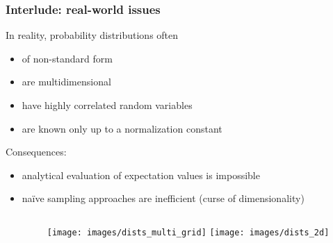 \documentclass[t,aspectratio=169]{beamer}
\begin{document}
\begin{frame}
  \frametitle{Interlude: real-world issues}
  In reality, probability distributions often
  \begin{itemize}
  \item of non-standard form
  \item are multidimensional
  \item have highly correlated random variables
  \item are known only up to a normalization constant
  \end{itemize}
  Consequences:
  \begin{itemize}
  \item analytical evaluation of expectation values is impossible
  \item naïve sampling approaches are inefficient (curse of dimensionality)
  \end{itemize}
  \begin{columns}
    \begin{column}[T]{0.33\textwidth}
    \end{column}
    \begin{column}[T]{0.63\textwidth}
      \texttt{[image: images/dists\_multi\_grid]}
      \texttt{[image: images/dists\_2d]}
    \end{column}
  \end{columns}
\end{frame}
\end{document}
